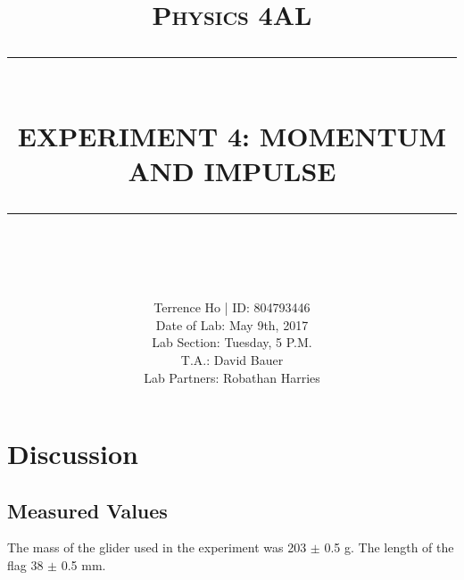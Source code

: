 \documentclass[11pt]{report}
\newcommand{\HRule}[1]{\rule{\linewidth}{#1}}
\begin{document}
\title{ \normalsize \textsc{Physics 4AL}
        \\ [2.0cm]
        \HRule{0.5pt} \\
        \LARGE \textbf{\uppercase{Experiment 4: Momentum and Impulse}}
        \HRule{2pt} \\ [0.5cm]
        \vspace*{2\baselineskip}}

\date{}

\author{
        Terrence Ho | ID: 804793446 \\ 
        Date of Lab: May 9th, 2017 \\
        Lab Section: Tuesday, 5 P.M.\\
        T.A.: David Bauer\\
        Lab Partners: Robathan Harries}

\maketitle
\tableofcontents
\newpage

\sectionfont{\scshape}

\section*{Discussion}

\subsection*{Measured Values}

The mass of the glider used in the experiment was 203 $\pm$ 0.5 g.  The length
of the flag 38 $\pm$ 0.5 mm.  
\end{document}
